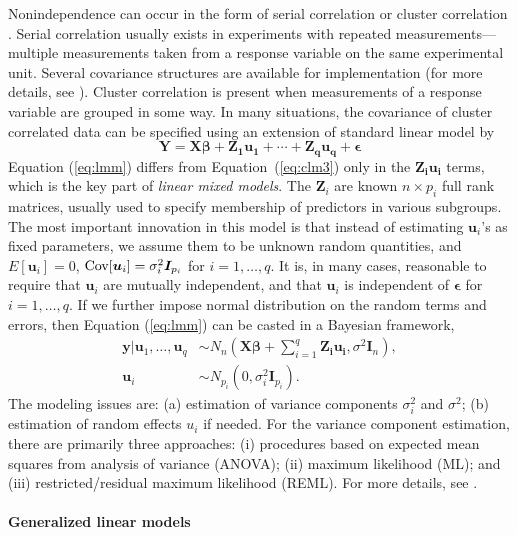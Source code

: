 Nonindependence can occur in the form of serial correlation or cluster correlation
\citep[chapter~17]{rencher2008linear}. Serial correlation usually exists in experiments with
repeated measurements---multiple measurements taken from a response variable on the same
experimental unit. Several covariance structures are available for implementation (for more details,
see \citealt[chapter~5]{littell2006sas}).  Cluster correlation is present when measurements of a
response variable are grouped in some way. In many situations, the covariance of cluster correlated
data can be specified using an extension of standard linear model by 
\begin{equation}\label{eq:lmm}
\bm Y = \bm {X\beta} + \bm {Z_1u_1}+\cdots + \bm {Z_qu_q} + \bm \epsilon	
\end{equation}
Equation (\ref{eq:lmm}) differs from Equation~(\ref{eq:clm3}) only in the $\bm {Z_iu_i}$ terms,
which is the key part of \textit{linear mixed models}.  The $\bm Z_i$  are known $n\times p_i$ full
rank matrices, usually used to specify membership of predictors in various subgroups. The most
important innovation in this model is that instead of estimating $\bm u_i$'s as fixed parameters, we
assume them to be unknown random quantities, and $E[\bm u_i]=0$, $\text{Cov}[\bm u_i]= \sigma_i^2 \bm
I_{p_i}$ for $i=1, \ldots, q$. It is, in many cases, reasonable to require that $\bm u_i$ are
mutually independent, and that $\bm u_i$ is independent of $\bm \epsilon$ for $i=1, \ldots, q$. If
we further impose normal distribution on the random terms and errors, then Equation (\ref{eq:lmm})
can be casted in a Bayesian framework,
\begin{equation}\label{eq:lmmGuass}
\begin{split}
\bm y|\bm u_1, \ldots, \bm u_q   & \sim  N_n(\bm {X\beta} + \sum_{i=1}^q \bm {Z_iu_i}, \sigma^2\bm
I_n),  \\
\bm u_i &\sim N_{p_i}(0, \sigma_i^2 \bm I_{p_i}).
\end{split}
\end{equation}
The modeling issues are: (a) estimation of variance components $\sigma_i^2$ and $\sigma^2$; (b)
estimation of random effects $u_i$ if needed. For the variance component estimation, there are
primarily three approaches: (i) procedures based on expected mean squares from analysis of variance
(ANOVA); (ii) maximum likelihood (ML); and (iii) restricted/residual maximum likelihood (REML). For
more details, see \citealt[Chapter 1]{littell2006sas}.


\paragraph{Generalized linear models}\label{para:glm}

